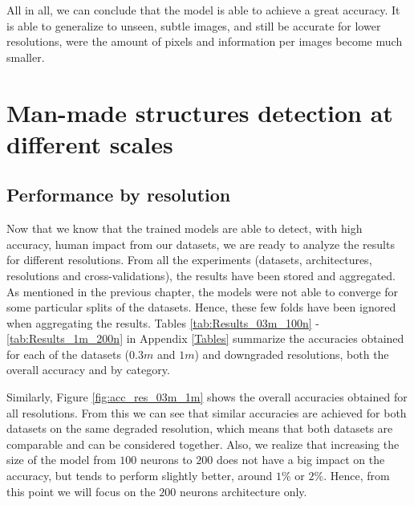 All in all, we can conclude that the model is able to achieve a great accuracy. It is able to generalize to unseen, subtle images, and still be accurate for lower resolutions, were the amount of pixels and information per images become much smaller. 


\section{Man-made structures detection at different scales}


\subsection{Performance by resolution}

Now that we know that the trained models are able to detect, with high accuracy, human impact from our datasets, we are ready to analyze the results for different resolutions. From all the experiments (datasets, architectures, resolutions and cross-validations), the results have been stored and aggregated. As mentioned in the previous chapter, the models were not able to converge for some particular splits of the datasets. Hence, these few folds have been ignored when aggregating the results. Tables \ref{tab:Results_03m_100n} - \ref{tab:Results_1m_200n} in Appendix \ref{Tables} summarize the accuracies obtained for each of the datasets ($0.3m$ and $1m$) and downgraded resolutions, both the overall accuracy and by category. 

Similarly, Figure \ref{fig:acc_res_03m_1m} shows the overall accuracies obtained for all resolutions. From this we can see that similar accuracies are achieved for both datasets on the same degraded resolution, which means that both datasets are comparable and can be considered together. Also, we realize that increasing the size of the model from $100$ neurons to $200$ does not have a big impact on the accuracy, but tends to perform slightly better, around $1\%$ or $2\%$. Hence, from this point we will focus on the $200$ neurons architecture only.

